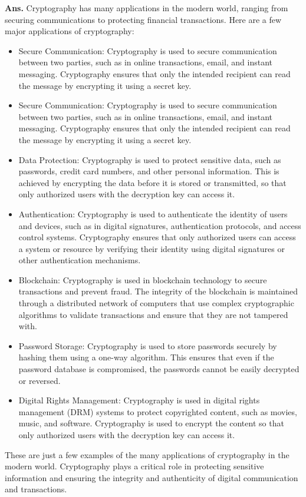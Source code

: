 \documentclass{article}
\begin{document}
\begin{enumerate}
	\textbf{Ans.}  Cryptography has many applications in the modern world, ranging from securing communications to protecting financial transactions. Here are a few major applications of cryptography:
	\begin{itemize}
		\item Secure Communication: Cryptography is used to secure communication between two parties, such as in online transactions, email, and instant messaging. Cryptography ensures that only the intended recipient can read the message by encrypting it using a secret key.
		\item Secure Communication: Cryptography is used to secure communication between two parties, such as in online transactions, email, and instant messaging. Cryptography ensures that only the intended recipient can read the message by encrypting it using a secret key.
		\item Data Protection: Cryptography is used to protect sensitive data, such as passwords, credit card numbers, and other personal information. This is achieved by encrypting the data before it is stored or transmitted, so that only authorized users with the decryption key can access it.
		\item  Authentication: Cryptography is used to authenticate the identity of users and devices, such as in digital signatures, authentication protocols, and access control systems. Cryptography ensures that only authorized users can access a system or resource by verifying their identity using digital signatures or other authentication mechanisms.
		\item Blockchain: Cryptography is used in blockchain technology to secure transactions and prevent fraud. The integrity of the blockchain is maintained through a distributed network of computers that use complex cryptographic algorithms to validate transactions and ensure that they are not tampered with.
		\item Password Storage: Cryptography is used to store passwords securely by hashing them using a one-way algorithm. This ensures that even if the password database is compromised, the passwords cannot be easily decrypted or reversed.
		\item Digital Rights Management: Cryptography is used in digital rights management (DRM) systems to protect copyrighted content, such as movies, music, and software. Cryptography is used to encrypt the content so that only authorized users with the decryption key can access it.
	\end{itemize}
	These are just a few examples of the many applications of cryptography in the modern world. Cryptography plays a critical role in protecting sensitive information and ensuring the integrity and authenticity of digital communication and transactions.
	

\end{enumerate}
\end{document}
